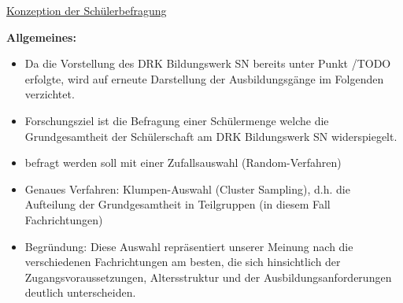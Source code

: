 \underline{Konzeption der Schülerbefragung}

\textbf{Allgemeines:}
\begin{itemize}
	\item Da die Vorstellung des DRK Bildungswerk SN bereits unter Punkt /TODO erfolgte, wird auf erneute Darstellung der Ausbildungsgänge im Folgenden verzichtet.
	\item Forschungsziel ist die Befragung einer Schülermenge welche die Grundgesamtheit der Schülerschaft am DRK Bildungswerk SN widerspiegelt.
	\item befragt werden soll mit einer Zufallsauswahl (Random-Verfahren)
	\item Genaues Verfahren: Klumpen-Auswahl (Cluster Sampling), d.h. die Aufteilung der Grundgesamtheit in Teilgruppen (in diesem Fall Fachrichtungen) 
	\item Begründung: Diese Auswahl repräsentiert unserer Meinung nach die verschiedenen Fachrichtungen am besten, die sich hinsichtlich der Zugangsvoraussetzungen, Altersstruktur und der Ausbildungsanforderungen deutlich unterscheiden.
\end{itemize}

